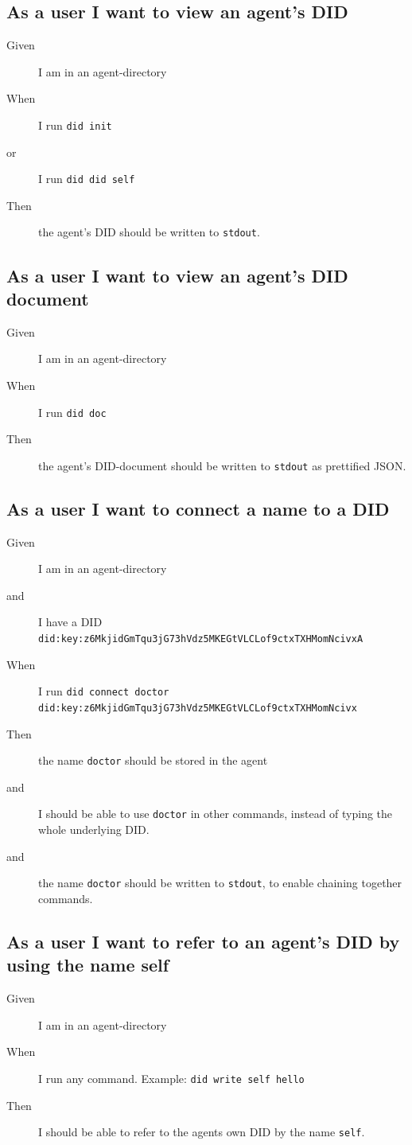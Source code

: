 \subsection{As a user I want to view an agent's DID}
\begin{description}
    \item[Given] I am in an agent-directory
    \item[When] I run \texttt{did init}
    \item[or] I run \texttt{did did self}
    \item[Then] the agent's DID should be written to \texttt{stdout}.
\end{description}


\subsection{As a user I want to view an agent's DID document}
\begin{description}
    \item[Given] I am in an agent-directory
    \item[When] I run \texttt{did doc}
    \item[Then] the agent's DID-document should be written to \texttt{stdout} as prettified JSON.
\end{description}


\subsection{As a user I want to connect a name to a DID}
\begin{description}
    \item[Given] I am in an agent-directory
    \item[and] I have a DID \texttt{did:key:z6MkjidGmTqu3jG73hVdz5MKEGtVLCLof9ctxTXHMomNcivxA}
    \item[When] I run \texttt{did connect doctor did:key:z6MkjidGmTqu3jG73hVdz5MKEGtVLCLof9ctxTXHMomNcivx}
    \item[Then] the name \texttt{doctor} should be stored in the agent
    \item[and] I should be able to use \texttt{doctor} in other commands, instead of typing the whole underlying DID.
    \item[and] the name \texttt{doctor} should be written to \texttt{stdout}, to enable chaining together commands.
\end{description}


\subsection{As a user I want to refer to an agent's DID by using the name self}
\begin{description}
    \item[Given] I am in an agent-directory
    \item[When] I run any command. Example: \texttt{did write self hello}
    \item[Then] I should be able to refer to the agents own DID by the name \texttt{self}.
\end{description}


